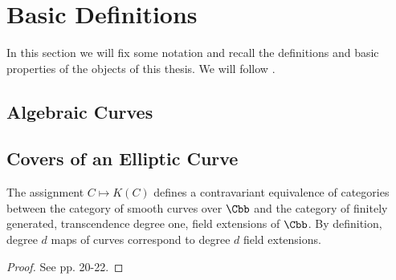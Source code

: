\section{Basic Definitions}

In this section we will fix some notation and recall the definitions and basic properties of the objects of this thesis. We will follow 
\cite{Silverman2009}.

\subsection{Algebraic Curves}

\iffalse
\begin{defi}
 The \emph{$n$-dimensional affine space} is the set $\Abb^n$ of $n$-tuples with entries in $\Cbb$.
\end{defi}

\begin{defi}
 For an ideal $J\subset \Cbb[x_1,\ldots,x_n]$ we define the \emph{zero set $V(J)$ of $J$} as the set of points $p \in \Cbb$. For a subset 
$X\subset \Abb^n$ we define the \emph{ideal $I(V)$ of $X$} as usual.
\end{defi}
\fi

\subsection{Covers of an Elliptic Curve}

\begin{prop} \label{prop:curves-to-fields}
 The assignment $C\mapsto K(C)$ defines a contravariant equivalence of categories between the category of smooth curves over $\Cbb$ and the 
category of finitely generated, transcendence degree one, field extensions of $\Cbb$. By definition, degree $d$ maps of curves correspond 
to degree $d$ field extensions.
\end{prop}

\begin{proof}
 See \cite{Silverman2009} pp. 20-22.
\end{proof}
